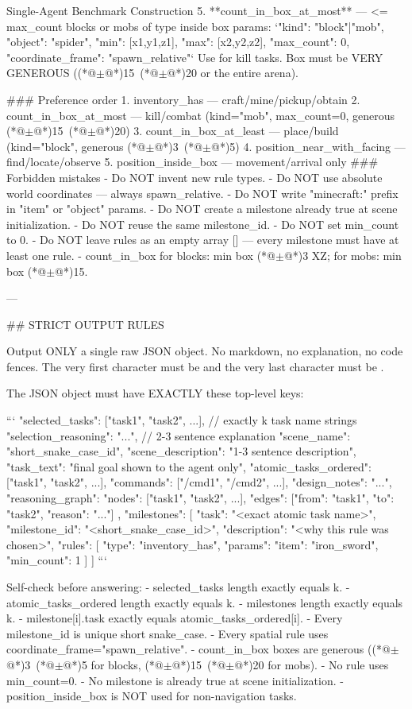 \documentclass[11pt]{article}
\begin{document}
\begin{center}
\begin{widepromptbox}{Single-Agent Benchmark Construction}
5. **count_in_box_at_most** — <= max_count blocks or mobs of type inside box
   params: `{"kind": "block"|"mob", "object": "spider", "min": [x1,y1,z1], "max": [x2,y2,z2], "max_count": 0, "coordinate_frame": "spawn_relative"}`
   Use for kill tasks. Box must be VERY GENEROUS ((*@$\pm$@*)15~(*@$\pm$@*)20 or the entire arena).

### Preference order
1. inventory_has — craft/mine/pickup/obtain
2. count_in_box_at_most — kill/combat (kind="mob", max_count=0, generous (*@$\pm$@*)15~(*@$\pm$@*)20)
3. count_in_box_at_least — place/build (kind="block", generous (*@$\pm$@*)3~(*@$\pm$@*)5)
4. position_near_with_facing — find/locate/observe
5. position_inside_box — movement/arrival only
### Forbidden mistakes
- Do NOT invent new rule types.
- Do NOT use absolute world coordinates — always spawn_relative.
- Do NOT write "minecraft:" prefix in "item" or "object" params.
- Do NOT create a milestone already true at scene initialization.
- Do NOT reuse the same milestone_id.
- Do NOT set min_count to 0.
- Do NOT leave rules as an empty array [] — every milestone must have at least one rule.
- count_in_box for blocks: min box (*@$\pm$@*)3 XZ; for mobs: min box (*@$\pm$@*)15.

---

## STRICT OUTPUT RULES

Output ONLY a single raw JSON object. No markdown, no explanation, no code fences.
The very first character must be { and the very last character must be }.

The JSON object must have EXACTLY these top-level keys:

```
{
  "selected_tasks": ["task1", "task2", ...],          // exactly {k} task name strings
  "selection_reasoning": "...",                        // 2-3 sentence explanation
  "scene_name": "short_snake_case_id",
  "scene_description": "1-3 sentence description",
  "task_text": "final goal shown to the agent only",
  "atomic_tasks_ordered": ["task1", "task2", ...],
  "commands": ["/cmd1", "/cmd2", ...],
  "design_notes": "...",
  "reasoning_graph": {
    "nodes": ["task1", "task2", ...],
    "edges": [{"from": "task1", "to": "task2", "reason": "..."}]
  },
  "milestones": [
    {
      "task": "<exact atomic task name>",
      "milestone_id": "<short_snake_case_id>",
      "description": "<why this rule was chosen>",
      "rules": [
        {"type": "inventory_has", "params": {"item": "iron_sword", "min_count": 1}}
      ]
    }
  ]
}
```

Self-check before answering:
- selected_tasks length exactly equals {k}.
- atomic_tasks_ordered length exactly equals {k}.
- milestones length exactly equals {k}.
- milestone[i].task exactly equals atomic_tasks_ordered[i].
- Every milestone_id is unique short snake_case.
- Every spatial rule uses coordinate_frame="spawn_relative".
- count_in_box boxes are generous ((*@$\pm$@*)3~(*@$\pm$@*)5 for blocks, (*@$\pm$@*)15~(*@$\pm$@*)20 for mobs).
- No rule uses min_count=0.
- No milestone is already true at scene initialization.
- position_inside_box is NOT used for non-navigation tasks.


\end{widepromptbox}
\end{center}
\end{document}
